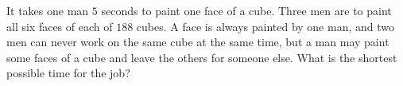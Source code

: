 It takes one man $5$ seconds to paint one face of a cube. Three men are to paint all six faces of each of $188$ cubes. A face is always painted by one man, and two men can never work on the same cube at the same time, but a man may paint some faces of a cube and leave the others for someone else. What is the shortest possible time for the job?
